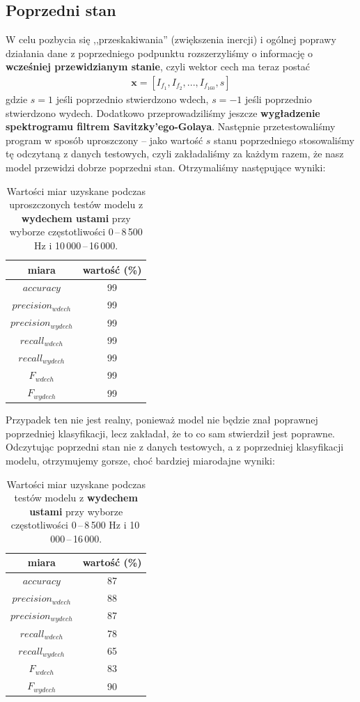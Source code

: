 \documentclass[polish]{article}
\begin{document}
\subsection{Poprzedni stan}
W celu pozbycia się ,,przeskakiwania'' (zwiększenia inercji) i ogólnej poprawy działania dane z poprzedniego podpunktu rozszerzyliśmy o informację o \textbf{wcześniej przewidzianym stanie}, czyli wektor cech ma teraz postać
\begin{gather*}
	\boldsymbol{x} = [I_{f_1}, I_{f_2}, ..., I_{f_{160}},  s]
\end{gather*}
 gdzie $s = 1$ jeśli poprzednio stwierdzono wdech, $s=-1$ jeśli poprzednio stwierdzono wydech.
Dodatkowo przeprowadziliśmy jeszcze \textbf{wygładzenie spektrogramu filtrem Savitzky'ego-Golaya}. Następnie przetestowaliśmy program w sposób uproszczony -- jako wartość $s$ stanu poprzedniego stosowaliśmy tę odczytaną z
danych testowych, czyli zakładaliśmy za każdym razem, że nasz model przewidzi dobrze poprzedni stan. Otrzymaliśmy następujące wyniki:
\begin{table}[H]
\caption{Wartości miar uzyskane podczas uproszczonych testów modelu z \textbf{wydechem ustami} przy wyborze częstotliwości 0\,--\,8\,500 \unit{Hz} i 10\,000\,--\,16\,000.}
\begin{center}
\begin{tabular}{c  | c }
	miara & wartość (\%) \\
	\hline
	$accuracy$ & 99 \\
	$precision_{wdech}$ & 99 \\
	$precision_{wydech}$ & 99 \\
	$recall_{wdech}$ & 99 \\
	$recall_{wydech}$ & 99 \\
	$F_{wdech}$ & 99 \\
	$F_{wydech}$ & 99
\end{tabular}
\end{center}
\end{table}
Przypadek ten nie jest realny, ponieważ model nie będzie znał poprawnej poprzedniej klasyfikacji, lecz 
zakładał, że to co sam stwierdził jest poprawne. Odczytując poprzedni stan nie z danych testowych, a z poprzedniej
klasyfikacji modelu, otrzymujemy gorsze, choć bardziej miarodajne wyniki:
\begin{table}[H]
\caption{Wartości miar uzyskane podczas testów modelu z \textbf{wydechem ustami} przy wyborze częstotliwości 0\,--\,8\,500 \unit{Hz} i 10\,000\,--\,16\,000.}
\begin{center}
\begin{tabular}{c  | c }
	miara & wartość (\%) \\
	\hline
	$accuracy$ & 87 \\
	$precision_{wdech}$ & 88 \\
	$precision_{wydech}$ & 87 \\
	$recall_{wdech}$ & 78 \\
	$recall_{wydech}$ & 65 \\
	$F_{wdech}$ & 83 \\
	$F_{wydech}$ & 90
\end{tabular}
\end{center}
\end{table}
\end{document}
